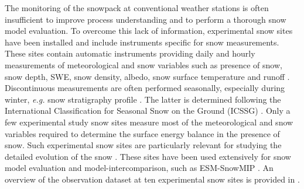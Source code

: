\documentclass[utf8]{frontiersSCNS} %
\begin{document}
The monitoring of the snowpack at conventional weather stations is often insufficient to improve process understanding and to perform a thorough snow model evaluation. To overcome this lack of information, experimental snow sites have been installed and include instruments specific for snow measurements. These sites contain automatic instruments providing daily and hourly measurements of meteorological and snow variables such as presence of snow, snow depth, SWE, snow density, albedo, snow surface temperature and runoff \citep{Pirazzini_2018}. Discontinuous measurements are often performed seasonally, especially during winter, \textit{e.g.} snow stratigraphy profile \citep{Morin_2012}. The latter is determined following the International Classification for Seasonal Snow on the Ground (ICSSG)  \citep{Fierz_2009}. Only a few experimental study snow sites measure most of the meteorological and snow variables required to determine the surface energy balance in the presence of snow. Such experimental snow sites are particularly relevant for studying the detailed evolution of the snow \citep[e.g.][]{Morin_2012,Essery_2016, Lejeune_2018}. These sites have been used extensively for snow model evaluation \citep{Magnusson_2015,Decharme_2016,Wang_2013,Piazzi_2018} and model-intercomparison, such as ESM-SnowMIP \citep{Krinner_2018}. An overview of the observation dataset at ten experimental snow sites is provided in \citet{Menard_2019}. 






\end{document}
